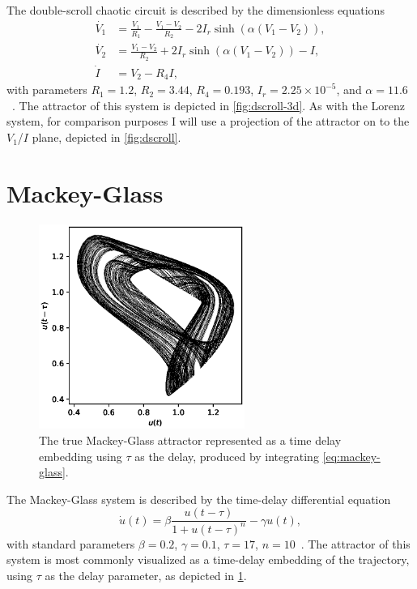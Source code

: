 The double-scroll chaotic circuit is described by the dimensionless equations
\begin{equation}
 \begin{aligned}
   \dot{V_1} &= \frac{V_1}{R_1} - \frac{V_1 - V_2}{R_2} - 2 I_r \sinh\left(\alpha(V_1 - V_2)\right), \\
   \dot{V_2} &= \frac{V_1 - V_2}{R_2} + 2 I_r \sinh\left(\alpha(V_1 - V_2)\right) - I, \\
   \dot{I} &= V_2 - R_4 I,
 \end{aligned}
 \label{eq:dscroll}
\end{equation}
with parameters $R_1 = 1.2$, $R_2 = 3.44$, $R_4 = 0.193$, $I_r = 2.25
\times 10^{-5}$, and $\alpha = 11.6$~\cite{gauthier1996}. The
attractor of this system is depicted in \cref{fig:dscroll-3d}. As
with the Lorenz system, for comparison purposes I will use a
projection of the attractor on to the $V_1$/$I$ plane, depicted in
\cref{fig:dscroll}.

\section{Mackey-Glass}\label{sec:mackey-glass}

\begin{figure}
  \includegraphics[width=0.6\textwidth]{figures/mackey-glass}
  \caption{The true Mackey-Glass attractor represented as a time delay embedding using $\tau$ as the delay, produced by integrating \cref{eq:mackey-glass}.}%
  \label{fig:mackey-glass}
\end{figure}

The Mackey-Glass system is described by the time-delay differential equation
\begin{equation}
  \dot{u}(t) = \beta \frac{u(t - \tau)}{1 + u(t - \tau)^n} - \gamma u(t),
  \label{eq:mackey-glass}
\end{equation}
with standard parameters $\beta = 0.2$, $\gamma = 0.1$, $\tau = 17$,
$n = 10$~\cite{mackey1977}. The attractor of this system is most
commonly visualized as a time-delay embedding of the trajectory, using
$\tau$ as the delay parameter, as depicted in \cref{fig:mackey-glass}.
